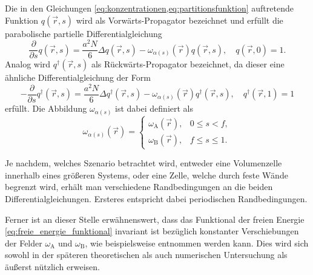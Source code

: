 \documentclass[../main.tex]{subfiles}
\begin{document}
Die in den Gleichungen \cref{eq:konzentrationen,eq:partitionsfunktion} auftretende Funktion $q(\vec{r}, s)$ wird als Vorwärts-Propagator bezeichnet und erfüllt die parabolische partielle Differentialgleichung
\begin{equation}
\label{eq:forward_propagator}
    \frac{\partial}{\partial s} q(\vec{r}, s) = \frac{a^{2}N}{6} \Delta q(\vec{r}, s) - \omega_{\alpha(s)}(\vec{r}) q(\vec{r}, s), \quad
    q(\vec{r}, 0) = 1.
\end{equation}
Analog wird $q^{\dagger}(\vec{r}, s)$ als Rückwärts-Propagator bezeichnet, da dieser eine ähnliche Differentialgleichung der Form
\begin{equation}
\label{eq:backward_propagator}
    -\frac{\partial}{\partial s}q^{\dagger}(\vec{r}, s) = \frac{a^{2}N}{6} \Delta q^{\dagger}(\vec{r}, s) - \omega_{\alpha(s)}(\vec{r}) q^{\dagger}(\vec{r}, s), \quad
    q^{\dagger}(\vec{r}, 1) = 1
\end{equation}%
erfüllt.
Die Abbildung $\omega_{\alpha(s)}$ ist dabei definiert als
\begin{equation}
    \omega_{\alpha(s)}(\vec{r}) = \begin{cases}
        \omega_{\mathrm{A}}(\vec{r}), & 0 \leq s < f,\\
        \omega_{\mathrm{B}}(\vec{r}), & f \leq s \leq 1.
    \end{cases}
\end{equation}


Je nachdem, welches Szenario betrachtet wird, entweder eine Volumenzelle innerhalb eines größeren Systems, oder eine Zelle, welche durch feste Wände begrenzt wird, erhält man verschiedene Randbedingungen an die beiden Differentialgleichungen.
Ersteres entspricht dabei periodischen Randbedingungen.

Ferner ist an dieser Stelle erwähnenswert, dass das Funktional der freien Energie \cref{eq:freie_energie_funktional} invariant ist bezüglich konstanter Verschiebungen der Felder $\omega_{\mathrm{A}}$ und $\omega_{\mathrm{B}}$, wie beispielsweise \cite{Ceniceros:2006is} entnommen werden kann.
Dies wird sich sowohl in der späteren theoretischen als auch numerischen Untersuchung als äußerst nützlich erweisen.
\end{document}

